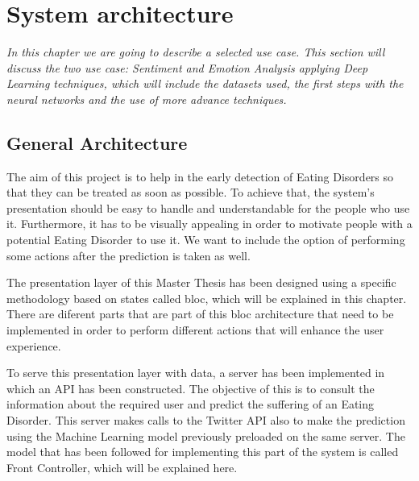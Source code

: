 \chapter{System architecture}
\label{chap:architecture}

\textit{In this chapter we are going to describe a selected use case. This section will discuss the two use case: Sentiment and Emotion Analysis applying Deep Learning techniques, which will include the datasets used, the first steps with the neural networks and the use of more advance techniques.}

\clearpage

\section{General Architecture}


The aim of this project is to help in the early detection of Eating Disorders so that they can be treated as soon as possible. To achieve that, the system's presentation should be easy to handle and understandable for the people who use it. Furthermore, it has to be visually appealing in order to motivate people with a potential Eating Disorder to use it. We want to include the option of performing some actions after the prediction is taken as well.

The presentation layer of this Master Thesis has been designed using a specific methodology based on states called bloc, which will be explained in this chapter. There are diferent parts that are part of this bloc architecture that need to be implemented in order to perform different actions that will enhance the user experience.

To serve this presentation layer with data, a server has been implemented in which an API has been constructed. The objective of this is to consult the information about the required user and predict the suffering of an Eating Disorder. This server makes calls to the Twitter API also to make the prediction using the Machine Learning model previously preloaded on the same server. The model that has been followed for implementing this part of the system is called Front Controller, which will be explained here.


